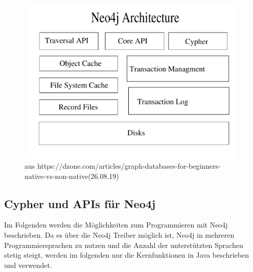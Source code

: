 \begin{figure}[H]
	\centering
	\includegraphics [width=12cm, height=8cm]{Figures/new_architecture}
	\caption[Architekur von Neo4j]{ aus https://dzone.com/articles/graph-databases-for-beginners-native-vs-non-native(26.08.19)}
	\label{fig:Architecure}
\end{figure}

\subsection{Cypher und APIs für Neo4j}
Im Folgenden werden die Möglichkeiten zum Programmieren mit Neo4j beschrieben. Da es über die Neo4j Treiber möglich ist, Neo4j in mehreren Programmiersprachen zu nutzen und die Anzahl der unterstützten Sprachen stetig steigt, werden im folgenden nur die Kernfunktionen in Java beschrieben und verwendet. 
